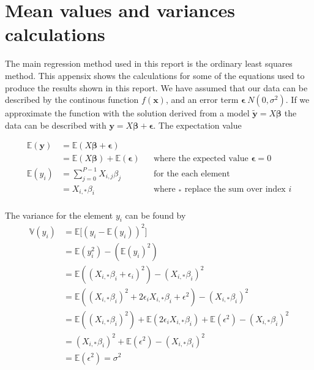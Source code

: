 \thispagestyle{plain}
\section{Mean values and variances calculations}


The main regression method used in this report is the ordinary least squares method.
This appensix shows the calculations for some of the equations used to produce the results shown in this report.
%
We have assumed that our data can be described by the continous function 
$f(\boldsymbol{x})$, and an error term $\boldsymbol{\epsilon} ~ N(0, \sigma^{2})$. 
If we approximate the function with the solution derived from a model $\boldsymbol{\tilde{y}} = X\boldsymbol{\beta}$ the data can be described with $\boldsymbol{y} = X\boldsymbol{\beta} + \boldsymbol{\epsilon}$. 
The expectation value 

\begin{align*}
    \mathbb{E}(\boldsymbol{y}) &= \mathbb{E}(X\boldsymbol{\beta} + \boldsymbol{\epsilon}) \\
    &= \mathbb{E}(X\boldsymbol{\beta}) + \mathbb{E}(\boldsymbol{\epsilon}) && \text{where the expected value $\boldsymbol{\epsilon} = 0$} \\
    \mathbb{E}(y_{i}) &= \sum_{j=0}^{P-1} X_{i,j} \beta_{j} && \text{for the each element} \\
    &= X_{i,*} \beta_{i} && \text{where $_{*}$ replace the sum over index $i$} \\
\end{align*}


The variance for the element $y_{i}$ can be found by
\begin{align*}
    \mathbb{V}(y_{i}) &= \mathbb{E} \big[ (y_{i} - \mathbb{E}(y_{i}))^{2} \big] \\
    &= \mathbb{E} (y_{i}^{2}) - (\mathbb{E}(y_{i})^{2}) \\
    &= \mathbb{E} ((X_{i,*} \beta_{i} + \epsilon_{i})^{2}) - (X_{i,*} \beta_{i})^{2} \\
    &= \mathbb{E} ((X_{i,*} \beta_{i})^{2} + 2\epsilon_{i}X_{i,*} \beta_{i} + \epsilon^{2}) - (X_{i,*} \beta_{i})^{2} \\
    &= \mathbb{E} ((X_{i,*} \beta_{i})^{2}) + \mathbb{E} (2\epsilon_{i}X_{i,*} \beta_{i}) + \mathbb{E} (\epsilon^{2}) - (X_{i,*} \beta_{i})^{2} \\
    &= (X_{i,*} \beta_{i})^{2} + \mathbb{E} (\epsilon^{2}) - (X_{i,*} \beta_{i})^{2} \\
    &= \mathbb{E} (\epsilon^{2}) = \sigma^{2} \\
\end{align*}

